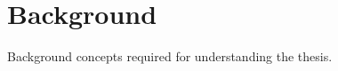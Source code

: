 \chapter{Background} 
\label{chapter:background}

Background concepts required for understanding the thesis. 